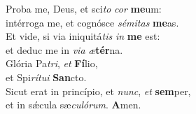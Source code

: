 \evenverse Proba me, Deus, et sci\textit{to} \textit{cor} \textbf{me}um:~\*\\
\evenverse intérroga me, et cognósce \textit{sé}\textit{mi}\textit{tas} \textbf{me}as.\\
\oddverse Et vide, si via iniquitá\textit{tis} \textit{in} \textbf{me} est:~\*\\
\oddverse et deduc me in \textit{vi}\textit{a} \textit{æ}\textbf{tér}na.\\
\evenverse Glória Pa\textit{tri}, \textit{et} \textbf{Fí}lio,~\*\\
\evenverse et Spi\textit{rí}\textit{tu}\textit{i} \textbf{San}cto.\\
\oddverse Sicut erat in princípio, et \textit{nunc}, \textit{et} \textbf{sem}per,~\*\\
\oddverse et in sǽcula sæ\textit{cu}\textit{ló}\textit{rum}. \textbf{A}men.\\
